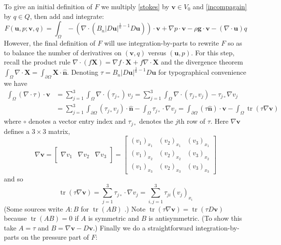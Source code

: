 \documentclass[letterpaper,final,12pt,reqno]{amsart}
\newcommand{\grad}{\nabla}
\newcommand{\trace}{\operatorname{tr}}
\newcommand{\hbn}{\hat{\mathbf{n}}}
\newcommand{\bu}{\mathbf{u}}
\newcommand{\bv}{\mathbf{v}}
\newcommand{\bX}{\mathbf{X}}
\begin{document}
To give an initial definition of $F$ we multiply \eqref{stokes} by $\bv\in V_0$ and \eqref{incompagain} by $q\in Q$, then add and integrate:
\begin{equation}
F(\bu,p;\bv,q) = \int_\Omega - \left(\nabla \cdot \left(B_n |D\bu|^{\frac{1}{n} - 1} D\bu\right)\right)\cdot \bv + \nabla p \cdot \bv - \rho \mathbf{g} \cdot \bv - \left(\nabla \cdot \bu\right) q \label{nonfuncone}
\end{equation}
However, the final definition of $F$ will use integration-by-parts to rewrite $F$ so as to balance the number of derivatives on $(\bv,q)$ versus $(\bu,p)$.  For this step, recall the product rule $\nabla \cdot(f\bX) = \grad f\cdot \bX + f \nabla \cdot \bX$ and the divergence theorem $\int_\Omega \nabla \cdot \bX = \int_{\partial \Omega} \bX \cdot \hbn$.  Denoting $\tau = B_n |D\bu|^{\frac{1}{n} - 1} D\bu$ for typographical convenience we have
\begin{align*}
\int_\Omega \left(\nabla \cdot \tau\right)\cdot \bv &= \sum_{j=1}^3 \int_\Omega \nabla \cdot (\tau_{j\circ})\, v_j = \sum_{j=1}^3 \int_\Omega \nabla \cdot (\tau_{j\circ} v_j) - \tau_{j\circ} \nabla v_j \\
  &= \sum_{j=1}^3 \int_{\partial \Omega} (\tau_{j\circ} v_j) \cdot \hbn - \int_\Omega \tau_{j\circ} \cdot \nabla v_j = \int_{\partial \Omega} (\tau \hbn)\cdot \bv - \int_\Omega \trace(\tau \nabla \bv)
\end{align*}
where $\circ$ denotes a vector entry index and $\tau_{j\circ}$ denotes the $j$th row of $\tau$.  Here $\grad\bv$ defines a $3\times 3$ matrix,
\newcommand{\trefthree}[3]{\left[\begin{array}{c|c|c} & & \\ #1 & #2 & #3 \\ & & \end{array}\right]}
    $$\grad \bv = \trefthree{\grad v_1}{\grad v_2}{\grad v_3} = \begin{bmatrix}
    (v_1)_{x_1} & (v_2)_{x_1} & (v_3)_{x_1} \\
    (v_1)_{x_2} & (v_2)_{x_2} & (v_3)_{x_2} \\
    (v_1)_{x_3} & (v_2)_{x_3} & (v_3)_{x_3}
    \end{bmatrix}$$
and so
    $$\trace(\tau \grad \bv) = \sum_{j=1}^3 \tau_{j\circ} \cdot \grad v_j = \sum_{i,j=1}^3 \tau_{ji} (v_j)_{x_i}$$
(Some sources write $A:B$ for $\trace(AB)$ \cite{JouvetRappaz2011}.)  Note $\trace(\tau \grad \bv) = \trace(\tau D\bv)$ because $\trace(AB)=0$ if $A$ is symmetric and $B$ is antisymmetric.  (To show this take $A=\tau$ and $B=\grad\bv-D\bv$.)  Finally we do a straightforward integration-by-parts on the pressure part of $F$:
\end{document}
